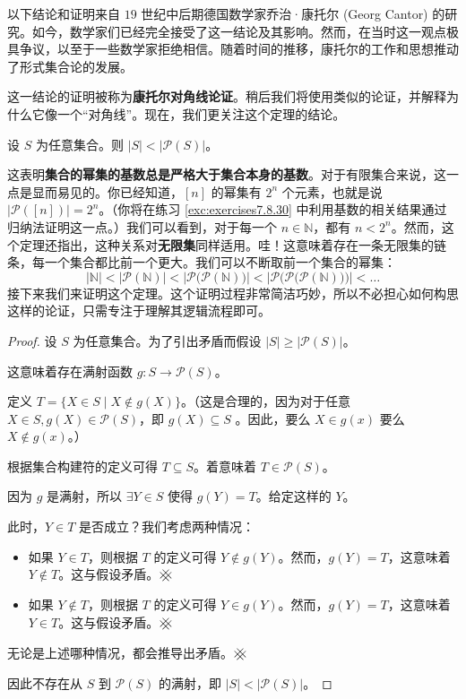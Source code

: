 以下结论和证明来自 $19$ 世纪中后期德国数学家乔治·康托尔 (Georg Cantor) 的研究。如今，数学家们已经完全接受了这一结论及其影响。然而，在当时这一观点极具争议，以至于一些数学家拒绝相信。随着时间的推移，康托尔的工作和思想推动了形式集合论的发展。

这一结论的证明被称为\textbf{康托尔对角线论证}。稍后我们将使用类似的论证，并解释为什么它像一个``对角线''。现在，我们更关注这个定理的结论。

\begin{theorem}
    设 $S$ 为任意集合。则 $|S| < |\mathcal{P}(S)|$。
\end{theorem}

这表明\textbf{集合的幂集的基数总是严格大于集合本身的基数}。对于有限集合来说，这一点是显而易见的。你已经知道，$[n]$ 的幂集有 $2^n$ 个元素，也就是说 $|\mathcal{P}([n])| = 2^n$。（你将在练习 \ref{exc:exercises7.8.30} 中利用基数的相关结果通过归纳法证明这一点。）我们可以看到，对于每一个 $n \in \mathbb{N}$，都有 $n < 2^n$。然而，这个定理还指出，这种关系对\textbf{无限集}同样适用。哇！这意味着存在一条无限集的链条，每一个集合都比前一个更大。我们可以不断取前一个集合的幂集：
\[|\mathbb{N}| < |\mathcal{P}(\mathbb{N})| < \big|\mathcal{P}\big(\mathcal{P}(\mathbb{N})\big)\big| < \Big|\mathcal{P}\Big(\mathcal{P}\big(\mathcal{P}(\mathbb{N})\big)\Big)\Big| < \dots
\]
接下来我们来证明这个定理。这个证明过程非常简洁巧妙，所以不必担心如何构思这样的论证，只需专注于理解其逻辑流程即可。

\begin{proof}
    设 $S$ 为任意集合。为了引出矛盾而假设 $|S| \ge |\mathcal{P}(S)|$。

    这意味着存在满射函数 $g : S \to \mathcal{P}(S)$。

    定义 $T = \{X \in S \mid X \notin g(X)\}$。（这是合理的，因为对于任意 $X \in S, g(X) \in \mathcal{P}(S)$，即 $g(X) \subseteq S$ 。因此，要么 $X \in g(x)$ 要么 $X \notin g(x)$。）

    根据集合构建符的定义可得 $T \subseteq S$。着意味着 $T \in \mathcal{P}(S)$。

    因为 $g$ 是满射，所以 $\exists Y \in S$ 使得 $g(Y) = T$。给定这样的 $Y$。

    此时，$Y \in T$ 是否成立？我们考虑两种情况：
    \begin{itemize}
        \item 如果 $Y \in T$，则根据 $T$ 的定义可得 $Y \notin g(Y)$。然而，$g(Y) = T$，这意味着 $Y \notin T$。这与假设矛盾。$\hashx$
        \item 如果 $Y \notin T$，则根据 $T$ 的定义可得 $Y \in g(Y)$。然而，$g(Y) = T$，这意味着 $Y \in T$。这与假设矛盾。$\hashx$
    \end{itemize}
    无论是上述哪种情况，都会推导出矛盾。$\hashx$

    因此不存在从 $S$ 到 $\mathcal{P}(S)$ 的满射，即 $|S| < |\mathcal{P}(S)|$。
\end{proof}

